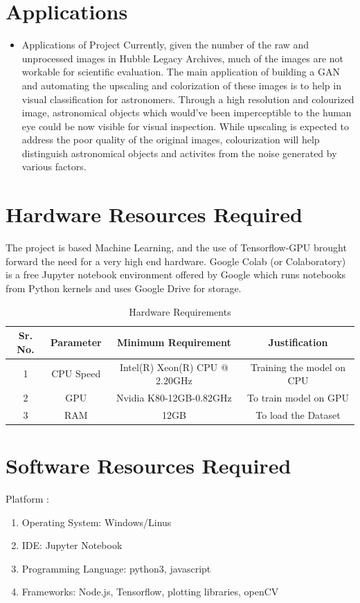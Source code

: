 \documentclass[oneside,a4paper,12pt]{report}
\begin{document}
\section{Applications}
\begin{itemize}
\item Applications of Project
          Currently, given the number of the raw and unprocessed images in Hubble Legacy Archives, much of the images are not workable for scientific evaluation. The main application of building a GAN and automating the upscaling and colorization of these images is to help in visual classification for astronomers. Through a high resolution and colourized image, astronomical objects which would've been imperceptible to the human eye could be now visible for visual inspection. While upscaling is expected to address the poor quality of the original images, colourization will help distinguish astronomical objects and activites from the noise generated by various factors.
\end{itemize}

\section{Hardware Resources Required}
The project is based Machine Learning, and the use of Tensorflow-GPU brought forward the need for a very high end hardware. Google Colab (or Colaboratory) is a free Jupyter notebook environment offered by Google which runs notebooks from Python kernels and uses Google Drive for storage.
\begin{table}[!htbp]
\begin{center}
\def\arraystretch{1.5}
  \begin{tabular}{| c | c | c | c |}
\hline
Sr. No. &	Parameter &	Minimum Requirement & Justification \\
\hline
1 &	CPU Speed &	 Intel(R) Xeon(R) CPU @ 2.20GHz  & Training the model on CPU\\
\hline
2 &	GPU  &	Nvidia K80-12GB-0.82GHz &  To train model on GPU\\
3 &	RAM  &	12GB &  To load the Dataset\\
 \hline

  \hline
\end{tabular}
 \caption { Hardware Requirements }
 \label{tab:hreq}
\end{center}
\end{table}

\section{Software Resources Required}
Platform :
\begin{enumerate}
\item Operating System: Windows/Linus
\item IDE: Jupyter Notebook
\item Programming Language: python3, javascript
\item Frameworks: Node.js, Tensorflow, plotting libraries, openCV
\end{enumerate}
\end{document}
